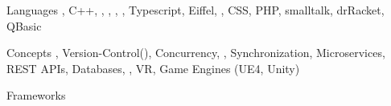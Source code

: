 

\begin{cvskills}

\cvskill
  {Languages} %
  {, C++, , , , , Typescript, Eiffel, , CSS, PHP, smalltalk, drRacket, QBasic} %

\cvskill
  {Concepts} %
  {, Version-Control(), Concurrency, , Synchronization, Microservices, REST APIs, Databases, , VR, Game Engines (UE4, Unity)} %

\cvskill
  {Frameworks} %
  {} %

\end{cvskills}
